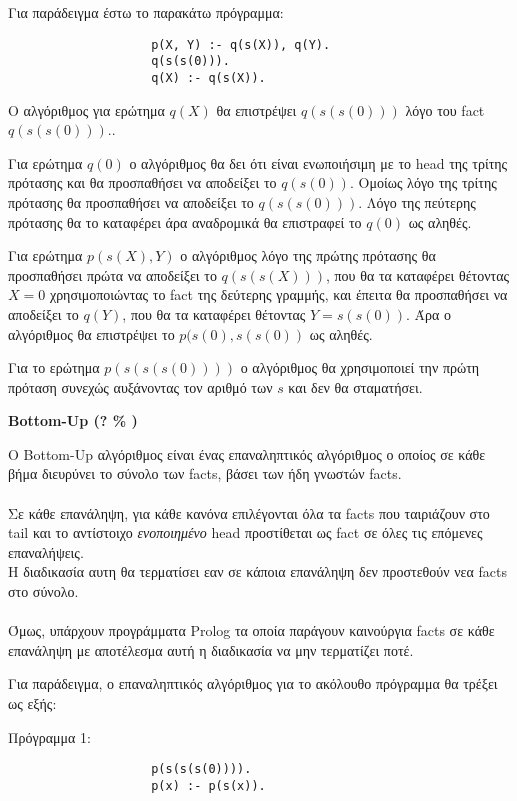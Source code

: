 \documentclass[10pt]{article}
\begin{document}
Για παράδειγμα έστω το παρακάτω πρόγραμμα:
\begin{verbatim}
                    p(X, Y) :- q(s(X)), q(Y).
                    q(s(s(0))).
                    q(X) :- q(s(X)).
\end{verbatim}

Ο αλγόριθμος για ερώτημα $q(X)$ θα επιστρέψει $q(s(s(0)))$ λόγο του fact $q(s(s(0))).$.

Για ερώτημα $q(0)$ ο αλγόριθμος θα δει ότι είναι ενωποιήσιμη με το head της τρίτης πρότασης και θα προσπαθήσει να αποδείξει το $q(s(0))$. Ομοίως λόγο της τρίτης πρότασης θα προσπαθήσει να αποδείξει το $q(s(s(0)))$. Λόγο της πεύτερης πρότασης θα το καταφέρει άρα αναδρομικά θα επιστραφεί το $q(0)$ ως αληθές.

Για ερώτημα $p(s(X),Y)$ ο αλγόριθμος λόγο της πρώτης πρότασης θα προσπαθήσει πρώτα να αποδείξει το $q(s(s(X)))$, που θα τα καταφέρει θέτοντας $X = 0$ χρησιμοποιώντας το fact της δεύτερης γραμμής, και έπειτα θα προσπαθήσει να αποδείξει το $q(Y)$, που θα τα καταφέρει θέτοντας $Y = s(s(0))$. Άρα ο αλγόριθμος θα επιστρέψει το $p(s(0),s(s(0))$ ως αληθές.

Για το ερώτημα $p(s(s(s(0))))$ ο αλγόριθμος θα χρησιμοποιεί την πρώτη πρόταση συνεχώς αυξάνοντας τον αριθμό των $s$ και δεν θα σταματήσει.

\textbf{Bottom-Up (? \% )}

O Bottom-Up αλγόριθμος είναι ένας επαναληπτικός αλγόριθμος ο οποίος σε κάθε βήμα διευρύνει το σύνολο των facts, βάσει των ήδη γνωστών facts.\\
\\
Σε κάθε επανάληψη, για κάθε κανόνα επιλέγονται όλα τα facts που ταιριάζουν στο tail και το αντίστοιχο \textit{ενοποιημένο} head προστίθεται ως fact σε όλες τις επόμενες επαναλήψεις.   
\\
Η διαδικασία αυτη θα τερματίσει εαν σε κάποια επανάληψη δεν προστεθούν νεα facts στο σύνολο.\\
\\
Όμως, υπάρχουν προγράμματα Prolog τα οποία παράγουν καινούργια facts σε κάθε επανάληψη με αποτέλεσμα αυτή η διαδικασία να μην τερματίζει ποτέ. 

Για παράδειγμα, ο επαναληπτικός αλγόριθμος για το ακόλουθο πρόγραμμα θα τρέξει ως εξής:


Πρόγραμμα 1:
\begin{verbatim}
                    p(s(s(s(0)))).
                    p(x) :- p(s(x)).
\end{verbatim}
\end{document}
